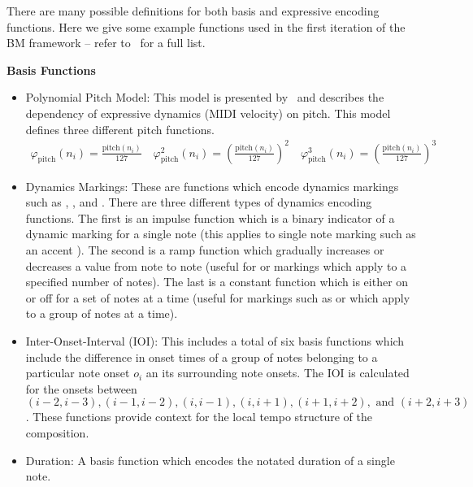 There are many possible definitions for both basis and expressive encoding functions. Here we give some example functions used in the first iteration of the BM framework -- refer to~\citet{eduardo2018computational} for a full list. 

\textbf{Basis Functions}

\newcommand{\pfunc}[1]{\varphi_{\textrm{pitch}}^#1(n_i)}
\newcommand{\pfuncnorm}{\varphi_{\textrm{pitch}}(n_i)}
\newcommand{\midip}{\textrm{pitch}}
\begin{itemize}
    \item Polynomial Pitch Model: This model is presented by~\citet{grachten2012linear} and describes the dependency of expressive dynamics (MIDI velocity) on pitch. This model defines three different pitch functions. 
    \begin{align*}
    \pfuncnorm{} = \frac{\midip (n_i)}{127} \quad \pfunc{2} = \left(\frac{\midip(n_i)}{127}\right)^2 \quad \pfunc{3} = \left(\frac{\midip (n_i)}{127}\right)^3    
    \end{align*}
    \item Dynamics Markings: These are functions which encode dynamics markings such as , , and . There are three different types of dynamics encoding functions. The first is an impulse function  which is a binary indicator of a dynamic marking for a single note (this applies to single note marking such as an accent \wedge). The second is a ramp function which gradually increases or decreases a value from note to note (useful for  or  markings which apply to a specified number of notes). The last is a constant function which is either on or off for a set of notes at a time (useful for markings such as  or  which apply to a group of notes at a time). 
    \item Inter-Onset-Interval (IOI): This includes a total of six basis functions which include the difference in onset times of a group of notes belonging to a particular note onset $o_i$ an its surrounding note onsets. The IOI is calculated for the onsets between $(i - 2, i-3), (i-1, i-2), (i, i-1), (i, i+1), (i+1, i+2), \textrm{ and } (i+2, i+3)$. These functions provide context for the local tempo structure of the composition. 
    \item Duration: A basis function which encodes the notated duration of a single note. 
\end{itemize}

